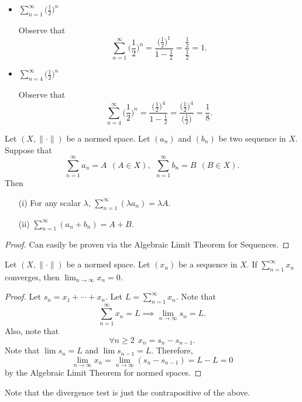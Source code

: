 \documentclass[a4paper]{article}
\begin{document}
\begin{eg}
    \begin{itemize}
        \item \( \sum_{ n=1  }^{ \infty   } \Big(  \frac{ 1 }{ 2 }  \Big)^{n} \)

            Observe that 
            \[  \sum_{ n=1  }^{ \infty  } \Big(  \frac{ 1 }{ 2 }  \Big)^{n} = \frac{ \Big(  \frac{ 1 }{ 2 }  \Big)^{1} }{  1 - \frac{ 1 }{ 2 }  }  = \frac{ \frac{ 1 }{ 2 }  }{ \frac{ 1 }{ 2 }  }  = 1.  \]

        \item \( \sum_{ n=4 }^{ \infty  } \Big(  \frac{ 1 }{ 2 }  \Big)^{n}  \)

            Observe that 
            \[  \sum_{ n=4 }^{ \infty  } \Big(  \frac{ 1 }{ 2 }  \Big)^{n} = \frac{ \Big(  \frac{ 1 }{ 2 }  \Big)^{4} }{  1 - \frac{ 1 }{ 2 }  } = \frac{ \Big(  \frac{ 1 }{ 2 }  \Big)^{4} }{  \Big(  \frac{ 1 }{ 2 }  \Big) }  = \frac{ 1 }{ 8 }. \]
    \end{itemize}
\end{eg}

\begin{theorem}[ ]
    Let \( (X , \|\cdot\|) \) be a normed space. Let \( ({a}_{n}) \) and \( ({b}_{n}) \) be two sequence in \( X  \). Suppose that 
    \[  \sum_{ n=1  }^{ \infty  } {a}_{n} = A \ \ (A \in X) , \ \ \sum_{ n=1  }^{ \infty  } {b}_{n} = B \ \ (B \in X). \]
    Then
    \begin{enumerate}
        \item[(i)] For any scalar \( \lambda  \), \( \sum_{ n=1  }^{ \infty   } (\lambda {a}_{n}) = \lambda A  \).
        \item[(ii)] \( \sum_{ n=1  }^{ \infty  } ({a}_{n} + {b}_{n}) = A + B \).
    \end{enumerate}
\end{theorem}
\begin{proof}
Can easily be proven via the Algebraic Limit Theorem for Sequences.
\end{proof}

\begin{theorem}
   Let \( (X,\|\cdot\|) \) be a normed space. Let \( ({x}_{n}) \) be a sequence in \( X  \). If \( \sum_{ n=1  }^{ \infty  } {x}_{n}  \) converges, then \( \lim_{ n \to \infty  }  {x}_{n} = 0  \). 
\end{theorem}
\begin{proof}
Let \( {s}_{n} = {x}_{1} + \cdots + {x}_{n} \). Let \( L = \sum_{ n=1  }^{ \infty  } {x}_{n} \). Note that 
\[  \sum_{ n=1  }^{ \infty  } {x}_{n} = L \implies \lim_{ n \to \infty  }  {s}_{n} = L.  \]
Also, note that 
\[  \forall n \geq 2 \ \ {x}_{n} = {s}_{n} - {s}_{n-1}. \]
Note that \( \lim {s}_{n} = L  \) and \( \lim {s}_{n-1} = L  \). Therefore, 
\[  \lim_{ n \to \infty  }  {x}_{n} = \lim_{ n \to \infty  }  ({s}_{n} - {s}_{n-1}) = L - L =  0  \]
by the Algebraic Limit Theorem for normed spaces.
\end{proof}
\begin{remark}
    Note that the divergence test is just the contrapositive of the above.
\end{remark}
\end{document}
